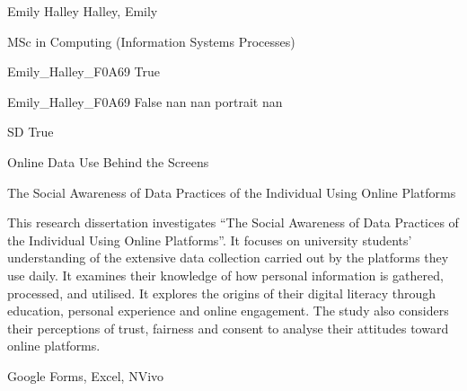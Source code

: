 \documentclass[twoside]{report}
\begin{document}
\begingroup{}\relax



\def\Key{Emily_Halley_F0A69}

{Emily Halley}
{Halley, Emily}

{MSc in Computing (Information Systems Processes)}

{Emily_Halley_F0A69}
{True}

{Emily_Halley_F0A69}
{False}
{nan}
{nan}
{portrait}
{nan}

{SD}
{True}

{Online Data Use Behind the Screens}

{The Social Awareness of Data Practices of the Individual Using Online Platforms}

{This research dissertation investigates \textquotedblleft{}The Social Awareness of Data Practices of the Individual Using Online Platforms\textquotedblright{}. It focuses on university students' understanding of the extensive data collection carried out by the platforms they use daily. It examines their knowledge of how personal information is gathered, processed, and utilised. It explores the origins of their digital literacy through education, personal experience and online engagement. The study also considers their perceptions of trust, fairness and consent to analyse their attitudes toward online platforms.}

{Google Forms, Excel, NVivo}
\end{document}

